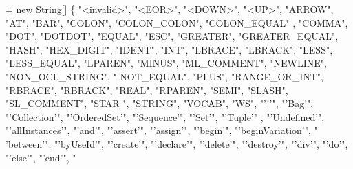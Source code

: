 \begin{DoxyCode}
= \textcolor{keyword}{new} String[] \{
        \textcolor{stringliteral}{"<invalid>"}, \textcolor{stringliteral}{"<EOR>"}, \textcolor{stringliteral}{"<DOWN>"}, \textcolor{stringliteral}{"<UP>"}, \textcolor{stringliteral}{"ARROW"}, \textcolor{stringliteral}{"AT"}, \textcolor{stringliteral}{"BAR"}, \textcolor{stringliteral}{"COLON"}, \textcolor{stringliteral}{"COLON\_COLON"}, \textcolor{stringliteral}{"COLON\_EQUAL"}
      , \textcolor{stringliteral}{"COMMA"}, \textcolor{stringliteral}{"DOT"}, \textcolor{stringliteral}{"DOTDOT"}, \textcolor{stringliteral}{"EQUAL"}, \textcolor{stringliteral}{"ESC"}, \textcolor{stringliteral}{"GREATER"}, \textcolor{stringliteral}{"GREATER\_EQUAL"}, \textcolor{stringliteral}{"HASH"}, \textcolor{stringliteral}{"HEX\_DIGIT"}, \textcolor{stringliteral}{"IDENT"}, \textcolor{stringliteral}{"INT"},
       \textcolor{stringliteral}{"LBRACE"}, \textcolor{stringliteral}{"LBRACK"}, \textcolor{stringliteral}{"LESS"}, \textcolor{stringliteral}{"LESS\_EQUAL"}, \textcolor{stringliteral}{"LPAREN"}, \textcolor{stringliteral}{"MINUS"}, \textcolor{stringliteral}{"ML\_COMMENT"}, \textcolor{stringliteral}{"NEWLINE"}, \textcolor{stringliteral}{"NON\_OCL\_STRING"}, \textcolor{stringliteral}{"
      NOT\_EQUAL"}, \textcolor{stringliteral}{"PLUS"}, \textcolor{stringliteral}{"RANGE\_OR\_INT"}, \textcolor{stringliteral}{"RBRACE"}, \textcolor{stringliteral}{"RBRACK"}, \textcolor{stringliteral}{"REAL"}, \textcolor{stringliteral}{"RPAREN"}, \textcolor{stringliteral}{"SEMI"}, \textcolor{stringliteral}{"SLASH"}, \textcolor{stringliteral}{"SL\_COMMENT"}, \textcolor{stringliteral}{"STAR
      "}, \textcolor{stringliteral}{"STRING"}, \textcolor{stringliteral}{"VOCAB"}, \textcolor{stringliteral}{"WS"}, \textcolor{stringliteral}{"'!'"}, \textcolor{stringliteral}{"'Bag'"}, \textcolor{stringliteral}{"'Collection'"}, \textcolor{stringliteral}{"'OrderedSet'"}, \textcolor{stringliteral}{"'Sequence'"}, \textcolor{stringliteral}{"'Set'"}, \textcolor{stringliteral}{"'Tuple'"}
      , \textcolor{stringliteral}{"'Undefined'"}, \textcolor{stringliteral}{"'allInstances'"}, \textcolor{stringliteral}{"'and'"}, \textcolor{stringliteral}{"'assert'"}, \textcolor{stringliteral}{"'assign'"}, \textcolor{stringliteral}{"'begin'"}, \textcolor{stringliteral}{"'beginVariation'"}, \textcolor{stringliteral}{"
      'between'"}, \textcolor{stringliteral}{"'byUseId'"}, \textcolor{stringliteral}{"'create'"}, \textcolor{stringliteral}{"'declare'"}, \textcolor{stringliteral}{"'delete'"}, \textcolor{stringliteral}{"'destroy'"}, \textcolor{stringliteral}{"'div'"}, \textcolor{stringliteral}{"'do'"}, \textcolor{stringliteral}{"'else'"}, \textcolor{stringliteral}{"'end'"}, \textcolor{stringliteral}{"
}
\end{DoxyCode}
